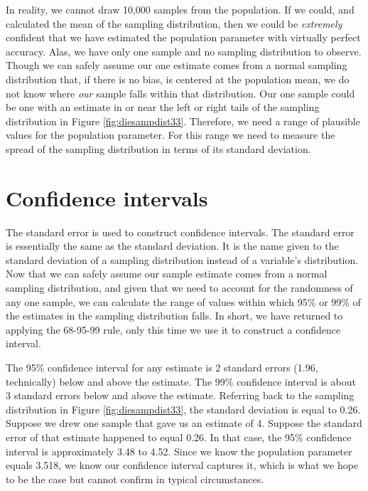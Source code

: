 \documentclass[
]{book}
\begin{document}
In reality, we cannot draw 10,000 samples from the population. If we could, and calculated the mean of the sampling distribution, then we could be \emph{extremely} confident that we have estimated the population parameter with virtually perfect accuracy. Alas, we have only one sample and no sampling distribution to observe. Though we can safely assume our one estimate comes from a normal sampling distribution that, if there is no bias, is centered at the population mean, we do not know where \emph{our} sample falls within that distribution. Our one sample could be one with an estimate in or near the left or right tails of the sampling distribution in Figure \ref{fig:diesampdist33}. Therefore, we need a range of plausible values for the population parameter. For this range we need to measure the spread of the sampling distribution in terms of its standard deviation.

\hypertarget{confidence-intervals}{%
\section{Confidence intervals}\label{confidence-intervals}}

The standard error is used to construct confidence intervals. The standard error is essentially the same as the standard deviation. It is the name given to the standard deviation of a sampling distribution instead of a variable's distribution. Now that we can safely assume our sample estimate comes from a normal sampling distribution, and given that we need to account for the randomness of any one sample, we can calculate the range of values within which 95\% or 99\% of the estimates in the sampling distribution falls. In short, we have returned to applying the 68-95-99 rule, only this time we use it to construct a confidence interval.

The 95\% confidence interval for any estimate is 2 standard errors (1.96, technically) below and above the estimate. The 99\% confidence interval is about 3 standard errors below and above the estimate. Referring back to the sampling distribution in Figure \ref{fig:diesampdist33}, the standard deviation is equal to 0.26. Suppose we drew one sample that gave us an estimate of 4. Suppose the standard error of that estimate happened to equal 0.26. In that case, the 95\% confidence interval is approximately 3.48 to 4.52. Since we know the population parameter equals 3.518, we know our confidence interval captures it, which is what we hope to be the case but cannot confirm in typical circumstances.
\end{document}
